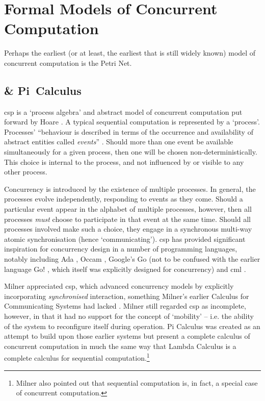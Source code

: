 \section{Formal Models of Concurrent Computation}
Perhaps the earliest (or at least, the earliest that is still widely known) model of concurrent computation is the Petri Net.

\cite{Varela2013}

\subsection{ \& Pi~Calculus}
\gls{csp} is a `process algebra' and abstract model of concurrent computation put forward by Hoare \cite{Hoare1985,Roscoe2011}.  A typical sequential computation is represented by a `process'.  Processes' ``behaviour is described in terms of the occurrence and availability of abstract entities called \textit{events}'' \cite[p.~478]{Roscoe2011}.  Should more than one event be available simultaneously for a given process, then one will be chosen non-deterministically.  This choice is internal to the process, and not influenced by or visible to any other process.  %

Concurrency is introduced by the existence of multiple processes.  In general, the processes evolve independently, responding to events as they come.  Should a particular event appear in the alphabet of multiple processes, however, then all processes \emph{must} choose to participate in that event at the same time.  Should all processes involved make such a choice, they engage in a synchronous multi-way atomic synchronisation (hence `communicating').  \gls{csp} has provided significant inspiration for concurrency design in a number of programming languages, notably including Ada \cite{Defense1983,Taft2013}, Occam \cite{Elizabeth1987}, Google's Go \cite{Meyerson2014} (not to be confused with the earlier language Go! \cite{Clark2004}, which itself was explicitly designed for concurrency) and \gls{cml} \cite{Reppy2011}. 

Milner appreciated \gls{csp}, which advanced concurrency models by explicitly incorporating \emph{synchronised} interaction, something Milner's earlier Calculus for Communicating Systems \cite{Milner1980} had lacked  \cite{Milner1993}.  Milner still regarded \gls{csp} as incomplete, however, in that it had no support for the concept of `mobility' -- i.e. the ability of the system to reconfigure itself during operation.  Pi Calculus was created as an attempt to build upon those earlier systems but present a complete calculus of concurrent computation in much the same way that Lambda Calculus \cite{Barendregt1984} is a complete calculus for sequential computation.\footnote{Milner also pointed out that sequential computation is, in fact, a special case of concurrent computation.}

